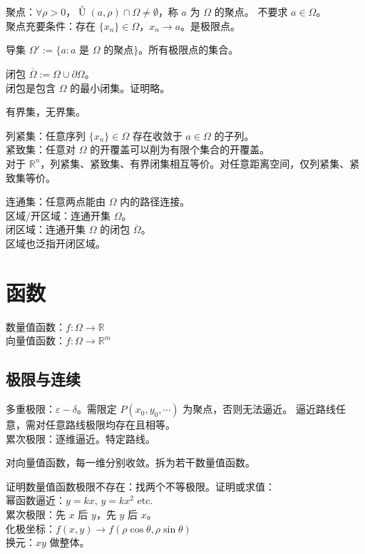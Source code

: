 \documentclass[12pt, a4paper, UTF8, openany]{ctexbook}
\newcommand{\field}[1]{\mathbb{#1}}%
\newcommand{\R}[1]{\field{R}^{#1}}
\newcommand{\uzero}{\mathop{U}\limits^{\circ}}%
\newcommand{\border}[1]{\partial{#1}}%
\newcommand{\closure}[1]{\overline{#1}}
\begin{document}
        聚点：$\forall \rho > 0$，$\uzero(a, \rho) \cap \Omega \neq \emptyset$，称 $a$ 为 $\Omega$ 的聚点。
        {\heiti 不要求 $a \in \Omega$}。\\
        聚点充要条件：存在 $\{x_n\} \in \Omega$，$x_n \to a$。是极限点。

        导集 $\Omega' := \{a: a\text{ 是 }\Omega\text{ 的聚点}\}$。所有极限点的集合。

        闭包 $\closure{\Omega} := \Omega \cup \border{\Omega}$。\\
        闭包是包含 $\Omega$ 的最小闭集。证明略。

        有界集，无界集。

        列紧集：任意序列 $\{x_n\} \in \Omega$ 存在收敛于 $a \in \Omega$ 的子列。\\
        紧致集：任意对 $\Omega$ 的开覆盖可以削为有限个集合的开覆盖。\\
        对于 $\R{n}$，{\heiti 列紧集、紧致集、有界闭集相互等价}。对任意距离空间，仅列紧集、紧致集等价。

        连通集：任意两点能由 $\Omega$ 内的路径连接。\\
        区域/开区域：连通开集 $\Omega$。\\
        闭区域：连通开集 $\Omega$ 的闭包 $\closure{\Omega}$。\\
        区域也泛指开闭区域。

    \section{函数}
    数量值函数：$f: \Omega \to \R{}$\\
    向量值函数：$f: \Omega \to \R{m}$

        \subsection{极限与连续}
        多重极限：$\varepsilon-\delta$。需限定 $P(x_0, y_0, \cdots)$ 为聚点，否则无法逼近。
        {\heiti 逼近路线任意}，需对任意路线极限均存在且相等。\\
        累次极限：逐维逼近。特定路线。

        对向量值函数，每一维分别收敛。拆为若干数量值函数。

        证明数量值函数极限不存在：找两个不等极限。证明或求值：\\
        幂函数逼近：$y = kx$, $y = kx^2$ etc. \\
        累次极限：先 $x$ 后 $y$，先 $y$ 后 $x$。\\
        化极坐标：$f(x, y) \to f(\rho\cos\theta, \rho\sin\theta)$ \\
        换元：$xy$ 做整体。
\end{document}
